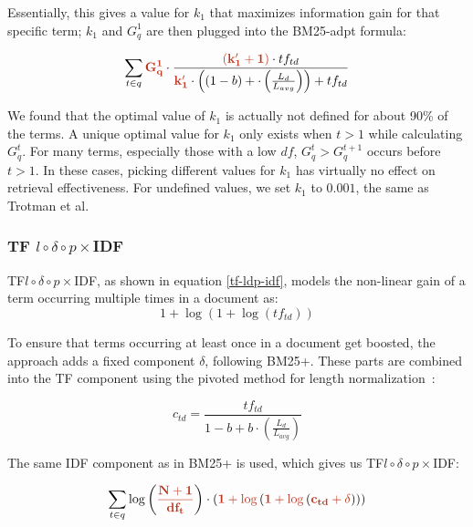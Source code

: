 Essentially, this gives a value for $k_1$ that maximizes information gain for that specific term; $k_1$ and $G^1_q$ are then plugged into the BM25-adpt formula: 

\begin{equation}
	\label{bm25-adpt}
	\sum_{t\in q}\mathbf{\begingroup\color{ruhuisstijlrood}G_q^1\endgroup}\cdot\frac{\mathbf{\begingroup\color{ruhuisstijlrood}\left(k'_1+1\right)\endgroup}\cdot tf_{td}}{\mathbf{\begingroup\color{ruhuisstijlrood}k'_1\endgroup}\cdot\left(\left(1-b\right)+\cdot\left(\frac{L_d}{L_{avg}}\right)\right)+tf_{td}}
\end{equation}

We found that the optimal value of $k_1$ is actually not defined for about 90\% of the terms. A unique optimal value for $k_1$ only exists when $t > 1$ while calculating $G^t_q$. For many terms, especially those with a low $df$, $G^t_q > G^{t+1}_q$ occurs before $t > 1$. In these cases, picking different values for $k_1$ has virtually no effect on retrieval effectiveness. For undefined values, we set $k_1$ to $0.001$, the same as Trotman et al.~\cite{trotman-bm25}


\subsubsection{TF $l\circ\delta\circ p\times$IDF~\cite{tf-ldp-idf}}
TF$l\circ\delta\circ p\times$IDF, as shown in equation \ref{tf-ldp-idf}, models the non-linear gain of a term occurring multiple times in a document as:
\begin{equation}
	1+\log\left(1+\log\left(tf_{td}\right)\right) 
\end{equation}

To ensure that terms occurring at least once in a document get boosted, the approach adds a fixed component $\delta$, following BM25+. These parts are combined into the TF component using the pivoted method for length normalization~\cite{ctd}:

\begin{equation}
	c_{td} = \frac{tf_{td}}{1-b+b\cdot\left(\frac{L_d}{L_{avg}}\right)}
\end{equation}

The same IDF component as in BM25+ is used, which gives us TF$l\circ\delta\circ p\times$IDF: 

\begin{equation}
	\label{tf-ldp-idf}
	\sum_{t\in q}\log\left(\mathbf{\begingroup\color{ruhuisstijlrood}\frac{N+1}{df_t}\endgroup}\right)\cdot\left(\mathbf{\begingroup\color{ruhuisstijlrood}1+\log\endgroup}\left(\mathbf{\begingroup\color{ruhuisstijlrood}1+\log\endgroup}\left(\mathbf{\begingroup\color{ruhuisstijlrood}c_{td}+\delta\endgroup}\right)\right)\right)
\end{equation}

